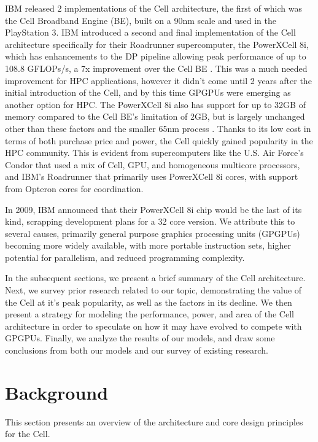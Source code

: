 \documentclass{sig-alternate-05-2015}
\begin{document}
IBM released 2 implementations of the Cell architecture, the first of which was the Cell Broadband Engine (BE), built on a 90nm scale and used in the PlayStation 3. IBM introduced a second and final implementation of the Cell architecture specifically for their Roadrunner supercomputer, the PowerXCell 8i, which has enhancements to the DP pipeline allowing peak performance of up to 108.8 GFLOPs/s, a 7x improvement over the Cell BE \cite{barker2008entering}. This was a much needed improvement for HPC applications, however it didn't come until 2 years after the initial introduction of the Cell, and by this time GPGPUs were emerging as another option for HPC. The PowerXCell 8i also has support for up to 32GB of memory compared to the Cell BE's limitation of 2GB, but is largely unchanged other than these factors and the smaller 65nm process \cite{barker2008entering}. 
Thanks to its low cost in terms of both purchase price and power, the Cell quickly gained popularity in the HPC community. This is evident from supercomputers like the U.S. Air Force's Condor \cite{luley2011energy} that used a mix of Cell, GPU, and homogeneous multicore processors, and IBM's Roadrunner \cite{barker2008entering} that primarily uses PowerXCell 8i cores, with support from Opteron cores for coordination.

In 2009, IBM announced that their PowerXCell 8i chip would be the last of its kind, scrapping development plans for a 32 core version. We attribute this to several causes, primarily general purpose graphics processing units (GPGPUs) becoming more widely available, with more portable instruction sets, higher potential for parallelism, and reduced programming complexity.

In the subsequent sections, we present a brief summary of the Cell architecture. Next, we survey prior research related to our topic, demonstrating the value of the Cell at it's peak popularity, as well as the factors in its decline. We then present a strategy for modeling the performance, power, and area of the Cell architecture in order to speculate on how it may have evolved to compete with GPGPUs. Finally, we analyze the results of our models, and draw some conclusions from both our models and our survey of existing research.
 
\section{Background}

This section presents an overview of the architecture and core design principles for the Cell.
\end{document}
